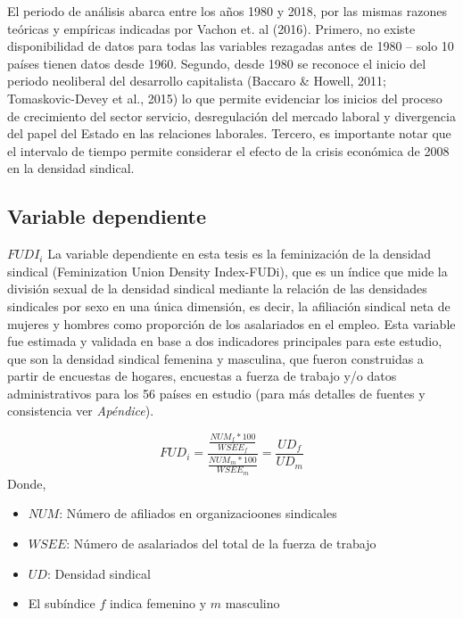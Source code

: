 \documentclass[
]{book}
\providecommand{\tightlist}{%
  \setlength{\itemsep}{0pt}\setlength{\parskip}{0pt}}
\begin{document}
El periodo de análisis abarca entre los años 1980 y 2018, por las mismas razones teóricas y empíricas indicadas por Vachon et. al (2016). Primero, no existe disponibilidad de datos para todas las variables rezagadas antes de 1980 -- solo 10 países tienen datos desde 1960. Segundo, desde 1980 se reconoce el inicio del periodo neoliberal del desarrollo capitalista (Baccaro \& Howell, 2011; Tomaskovic-Devey et al., 2015) lo que permite evidenciar los inicios del proceso de crecimiento del sector servicio, desregulación del mercado laboral y divergencia del papel del Estado en las relaciones laborales. Tercero, es importante notar que el intervalo de tiempo permite considerar el efecto de la crisis económica de 2008 en la densidad sindical.

\hypertarget{variable-dependiente}{%
\subsection{Variable dependiente}\label{variable-dependiente}}

\emph{\(FUDI_{i}\)}
La variable dependiente en esta tesis es la feminización de la densidad sindical (Feminization Union Density Index-FUDi), que es un índice que mide la división sexual de la densidad sindical mediante la relación de las densidades sindicales por sexo en una única dimensión, es decir, la afiliación sindical neta de mujeres y hombres como proporción de los asalariados en el empleo. Esta variable fue estimada y validada en base a dos indicadores principales para este estudio, que son la densidad sindical femenina y masculina, que fueron construidas a partir de encuestas de hogares, encuestas a fuerza de trabajo y/o datos administrativos para los 56 países en estudio (para más detalles de fuentes y consistencia ver \emph{Apéndice}).

\[FUD_{i} = \frac{\frac{NUM_{f}*100}{WSEE_{f}}}{{\frac{NUM_{m}*100}{WSEE_{m}}}} = \frac {UD_{f}}{UD_{m}}\]
Donde,

\begin{itemize}
\tightlist
\item
  \(NUM\): Número de afiliados en organizacioones sindicales
\item
  \(WSEE\): Número de asalariados del total de la fuerza de trabajo
\item
  \(UD\): Densidad sindical
\item
  El subíndice \(f\) indica femenino y \(m\) masculino
\end{itemize}
\end{document}
